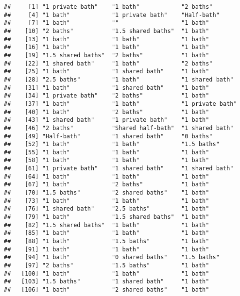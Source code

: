 \documentclass[
]{article}
\begin{document}
\begin{verbatim}
##     [1] "1 private bath"    "1 bath"            "2 baths"          
##     [4] "1 bath"            "1 private bath"    "Half-bath"        
##     [7] "1 bath"            ""                  "1 bath"           
##    [10] "2 baths"           "1.5 shared baths"  "1 bath"           
##    [13] "1 bath"            "1 bath"            "1 bath"           
##    [16] "1 bath"            "1 bath"            "1 bath"           
##    [19] "1.5 shared baths"  "2 baths"           "1 bath"           
##    [22] "1 shared bath"     "1 bath"            "2 baths"          
##    [25] "1 bath"            "1 shared bath"     "1 bath"           
##    [28] "2.5 baths"         "1 bath"            "1 shared bath"    
##    [31] "1 bath"            "1 shared bath"     "1 bath"           
##    [34] "1 private bath"    "2 baths"           "1 bath"           
##    [37] "1 bath"            "1 bath"            "1 private bath"   
##    [40] "1 bath"            "2 baths"           "1 bath"           
##    [43] "1 shared bath"     "1 private bath"    "1 bath"           
##    [46] "2 baths"           "Shared half-bath"  "1 shared bath"    
##    [49] "Half-bath"         "1 shared bath"     "0 baths"          
##    [52] "1 bath"            "1 bath"            "1.5 baths"        
##    [55] "1 bath"            "1 bath"            "1 bath"           
##    [58] "1 bath"            "1 bath"            "1 bath"           
##    [61] "1 private bath"    "1 shared bath"     "1 shared bath"    
##    [64] "1 bath"            "1 bath"            "1 bath"           
##    [67] "1 bath"            "2 baths"           "1 bath"           
##    [70] "1.5 baths"         "2 shared baths"    "1 bath"           
##    [73] "1 bath"            "1 bath"            "1 bath"           
##    [76] "1 shared bath"     "2.5 baths"         "1 bath"           
##    [79] "1 bath"            "1.5 shared baths"  "1 bath"           
##    [82] "1.5 shared baths"  "1 bath"            "1 bath"           
##    [85] "1 bath"            "1 bath"            "1 bath"           
##    [88] "1 bath"            "1.5 baths"         "1 bath"           
##    [91] "1 bath"            "1 bath"            "1 bath"           
##    [94] "1 bath"            "0 shared baths"    "1.5 baths"        
##    [97] "2 baths"           "1.5 baths"         "1 bath"           
##   [100] "1 bath"            "1 bath"            "1 bath"           
##   [103] "1.5 baths"         "1 shared bath"     "1 bath"           
##   [106] "1 bath"            "2 shared baths"    "1 bath"           

\end{verbatim}
\end{document}
